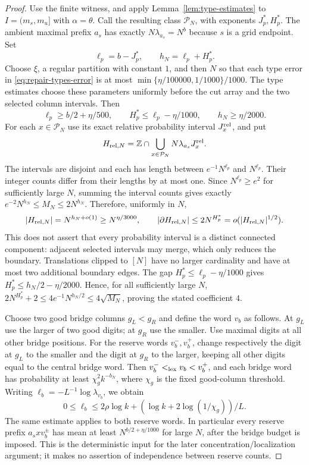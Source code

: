 \begin{proof}

Use the finite witness, and apply Lemma~\ref{lem:type-estimates} to
$I=(m_s,m_u]$ with $\alpha=\theta$.
Call the resulting class $\mathcal P_N$, with exponents $J_p^*,H_p^*$.
The ambient maximal prefix $a_s$ has exactly
$N\lambda_{a_s}=N^b$ because $s$ is a grid endpoint.
Set
\[
 \ell_p=b-J_p^*,\qquad h_N=\ell_p+H_p^*.
\]
Choose $\xi$, a regular partition with constant $1$, and then $N$ so that each type error in \eqref{eq:repair-types-error} is at most $\min\{\eta/100000,1/1000\}/1000$. The type estimates choose these parameters uniformly before the cut array and the two selected column intervals.
Then
\begin{equation}\label{eq:repair-finite-geometric-buffers}
 \ell_p\ge b/2+\eta/500,\qquad
 H_p^*\le\ell_p-\eta/1000,\qquad h_N\ge\eta/2000.
\end{equation}
For each $x\in\mathcal P_N$ use its exact relative probability interval
$J_x^{\rm rel}$, and put
\[
 H_{{\rm rel},N}=\mathbb Z\cap\bigcup_{x\in\mathcal P_N}
                         N\lambda_{a_s}J_x^{\rm rel}.
\]
The intervals are disjoint and each has length between
$e^{-1}N^{\ell_p}$ and $N^{\ell_p}$.  Their integer counts differ from their
lengths by at most one. Since $N^{\ell_p}\ge e^2$ for sufficiently large $N$, summing the interval counts gives exactly $e^{-2}N^{h_N}\le M_N\le2N^{h_N}$. Therefore, uniformly in $N$,
\[
 |H_{{\rm rel},N}|=N^{h_N+o(1)}\ge N^{\eta/3000},\qquad
 |\partial H_{{\rm rel},N}|\le2N^{H_p^*}
                         =o(|H_{{\rm rel},N}|^{1/2}).
\]
This does not assert that every probability interval is a distinct connected
component: adjacent selected intervals may merge, which only reduces the
boundary.  Translations clipped to $[N]$ have no larger cardinality and
have at most two additional boundary edges. The gap $H_p^*\le\ell_p-\eta/1000$ gives $H_p^*\le h_N/2-\eta/2000$. Hence, for all sufficiently large $N$, $2N^{H_p^*}+2\le4e^{-1}N^{h_N/2}\le4\sqrt{M_N}$, proving the stated coefficient $4$.

Choose two good bridge columns $g_L<g_R$ and define the word $v_b$ as follows.
At $g_L$ use the larger of two good digits; at $g_R$ use the smaller.
Use maximal digits at all other bridge positions.
For the reserve words $v_b^-,v_b^+$, change respectively the digit at
$g_L$ to the smaller and the digit at $g_R$ to the larger, keeping all
other digits equal to the central bridge word.
Then $v_b^-<_{\rm lex}v_b<v_b^+$, and each bridge word has probability at least
$\chi_g^2k^{-b_N}$, where $\chi_g$ is the fixed good-column threshold.
Writing $\ell_b=-L^{-1}\log\lambda_{v_b}$, we obtain
\[
 0\le\ell_b\le 2\rho\log k+(\log k+2\log(1/\chi_g))/L.
\]
The same estimate applies to both reserve words.  In particular every
reserve prefix $a_sxv_b^\pm$ has mean at least
$N^{b/2+\eta/1000}$ for large $N$, after the bridge budget is imposed.
This is the deterministic input for the later concentration/localization
argument; it makes no assertion of independence between reserve counts.


\end{proof}
